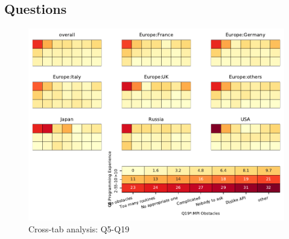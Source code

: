 
\subsection{Questions}


\begin{figure}
\begin{center}
\includegraphics[width=12cm]{../pdfs/Q5-Q19.pdf}
\caption{Cross-tab analysis: Q5-Q19}
\label{fig:Q5-Q19}
\end{center}
\end{figure}
